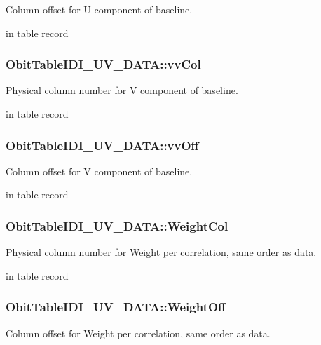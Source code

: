 Column offset for U component of baseline. 

in table record 
\subsubsection{ {\bf Obit\-Table\-IDI\_\-UV\_\-DATA::vv\-Col}}\label{structObitTableIDI__UV__DATA_o84}


Physical column number for V component of baseline. 

in table record 
\subsubsection{ {\bf Obit\-Table\-IDI\_\-UV\_\-DATA::vv\-Off}}\label{structObitTableIDI__UV__DATA_o83}


Column offset for V component of baseline. 

in table record 
\subsubsection{ {\bf Obit\-Table\-IDI\_\-UV\_\-DATA::Weight\-Col}}\label{structObitTableIDI__UV__DATA_o104}


Physical column number for Weight per correlation, same order as data. 

in table record 
\subsubsection{ {\bf Obit\-Table\-IDI\_\-UV\_\-DATA::Weight\-Off}}\label{structObitTableIDI__UV__DATA_o103}


Column offset for Weight per correlation, same order as data. 

